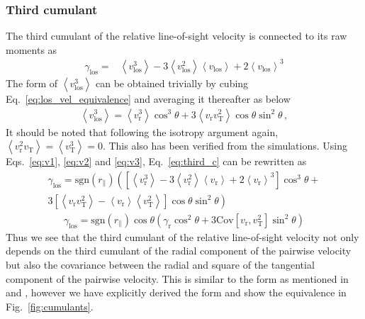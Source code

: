 \documentclass[a4paper,fleqn,usenatbib]{mnras}
\begin{document}
	\subsubsection{Third cumulant}
	\noindent The third cumulant of the relative line-of-sight velocity is connected to its raw moments as
	\begin{eqnarray}\label{eq:third_c}
		\gamma_{\mathrm{los}} = & \left\langle v^3_{\mathrm{los}} \right\rangle - 3 \left\langle v^2_{\mathrm{los}} \right\rangle \left\langle v_{\mathrm{los}}\right\rangle  + 2 \left\langle v_{\mathrm{los}}\right\rangle^3 
	\end{eqnarray}
	The form of $\left\langle v^3_{\mathrm{los}} \right\rangle$ can be obtained trivially by cubing Eq.~\ref{eq:los_vel_equivalence} and averaging it thereafter as below
	\begin{eqnarray}\label{eq:v3}
	\left\langle v^3_{\mathrm{los}} \right\rangle = \left\langle v^3_{\mathrm{r}}\right\rangle \cos^3\theta + 3 \left\langle  v_{\mathrm{r}}v^2_{\mathrm{T}}\right\rangle\cos\theta\sin^2\theta \, ,
	\end{eqnarray}	
	\noindent It should be noted that following the isotropy argument again, $\left\langle  v^2_{\mathrm{r}}v_{\mathrm{T}}\right\rangle = \left\langle v^3_{\mathrm{T}}\right\rangle = 0$. This also has been verified from the simulations. Using Eqs.~\ref{eq:v1}, \ref{eq:v2} and \ref{eq:v3}, Eq.~\ref{eq:third_c} can be rewritten as
	\begin{multline}
		\gamma_{\mathrm{los}} = \mathrm{sgn}(r_{\parallel}) \left(\left[\left\langle v^3_{\mathrm{r}} \right\rangle - 3 \left\langle v^2_{\mathrm{r}} \right\rangle \left\langle v_{\mathrm{r}}\right\rangle  + 2 \left\langle v_{\mathrm{r}}\right\rangle^3\right]\cos^3\theta + \right.\\
		\left. 3 \left[\left\langle  v_{\mathrm{r}}v^2_{\mathrm{T}}\right\rangle - \left\langle  v_{\mathrm{r}}\right\rangle \left\langle v^2_{\mathrm{T}}\right\rangle\right]\cos\theta\sin^2\theta\right)
	\end{multline}
	\begin{eqnarray}\label{eq:c3}
		\gamma_{\mathrm{los}} = \mathrm{sgn}(r_{\parallel}) \cos\theta \left(\gamma_{\mathrm{r}}\cos^2\theta  + 3 \mathrm{Cov}\left[v_{\mathrm{r}},v^2_{\mathrm{T}}\right]\sin^2\theta \right)
	\end{eqnarray}
	\noindent Thus we see that the third cumulant of the relative line-of-sight velocity not only depends on the third cumulant of the radial component of the pairwise velocity but also the covariance between the radial and square of the tangential component of the pairwise velocity. This is similar to the form as mentioned in \citealt{uh15} and \citealt{bi2}, however we have explicitly derived the form and show the equivalence in Fig.~\ref{fig:cumulants}.
	
\end{document}
